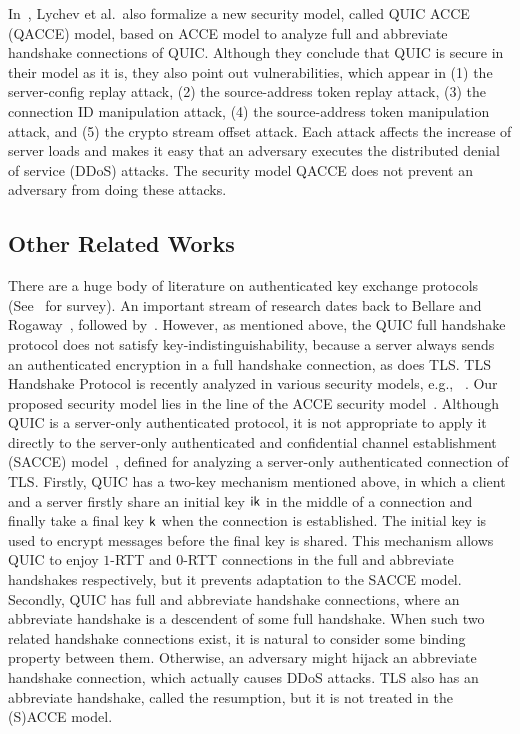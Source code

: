 In~\cite{LJBN15:QUIC}, Lychev et al.~also formalize a new security model, called QUIC ACCE (QACCE) model,  
based on ACCE model to analyze full and abbreviate handshake connections of QUIC.
Although they conclude that QUIC is secure in their model as it is, 
they also point out vulnerabilities, which appear in 
(1) the server-config replay attack, (2) the source-address token replay attack, 
(3) the connection ID manipulation attack, (4) the source-address token manipulation attack, 
and (5) the crypto stream offset attack. 
Each attack affects the increase of server loads and makes it easy that 
an adversary executes the distributed denial of service (DDoS) attacks. 
The security model QACCE does not prevent an adversary from doing these attacks.


\subsection{Other Related Works} \label{sec:Related Work}
There are a huge body of literature on authenticated key exchange protocols 
(See~\cite{CK01:AKE,JKSS12:ACCE,KPW13:SACCE} for survey). 
An important stream of research dates back to Bellare and Rogaway~\cite{BR93:AKE}, 
followed by~\cite{DB96,Blei98,JMDP00,Kraw01,JB02,KK05:TLS,KCRE08,SMOAJ08,EK09,KTT11,}.
However, as mentioned above, the QUIC full handshake protocol does not satisfy key-indistinguishability,  
because a server always sends an authenticated encryption in a full handshake connection, as does TLS.
TLS Handshake Protocol is recently analyzed in various security models, 
e.g., ~\cite{JKSS12:ACCE,KPW13:SACCE,FS13:ACCE,GKS13:RACCE,BDKSS14:SSH,BFKPSB14:TLS}. 
Our proposed security model lies in the line of 
the ACCE security model~\cite{JKSS12:ACCE,KPW13:SACCE}. 
Although QUIC is a server-only authenticated protocol, 
it is not appropriate to apply it directly to 
the server-only authenticated and confidential channel establishment
(SACCE) model~\cite{KPW13:SACCE}, defined for analyzing 
a server-only authenticated connection of TLS. 
Firstly, QUIC has a two-key mechanism mentioned above, 
in which a client and a server firstly share an initial 
key $\mathsf{ik}$ in the middle of a connection and finally take a final key $\mathsf{k}$ when the connection is established.
The initial key is used to encrypt messages before the final key is shared. 
This mechanism allows QUIC to enjoy $1$-RTT and $0$-RTT connections in the full and abbreviate handshakes  
respectively, but it prevents adaptation to the SACCE model. 
Secondly, QUIC has full and abbreviate handshake connections, where 
an abbreviate handshake is a descendent  of some full handshake. 
When such two related handshake connections exist, 
it is natural to consider some binding property between them. 
Otherwise, an adversary might hijack an abbreviate handshake connection, 
which actually causes DDoS attacks.
TLS also has an abbreviate handshake, called the resumption, but 
it is not treated in the (S)ACCE model. 

